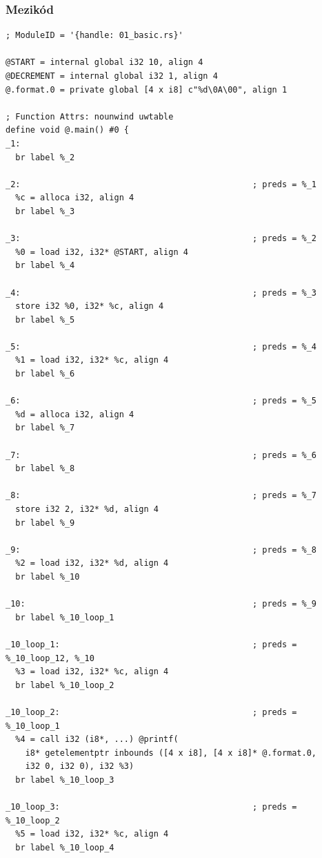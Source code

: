 \documentclass[12pt,a4paper]{article}
\begin{document}
\subsubsection{Mezikód}

\begin{verbatim}
; ModuleID = '{handle: 01_basic.rs}'

@START = internal global i32 10, align 4
@DECREMENT = internal global i32 1, align 4
@.format.0 = private global [4 x i8] c"%d\0A\00", align 1

; Function Attrs: nounwind uwtable
define void @.main() #0 {
_1:
  br label %_2

_2:                                               ; preds = %_1
  %c = alloca i32, align 4
  br label %_3

_3:                                               ; preds = %_2
  %0 = load i32, i32* @START, align 4
  br label %_4

_4:                                               ; preds = %_3
  store i32 %0, i32* %c, align 4
  br label %_5

_5:                                               ; preds = %_4
  %1 = load i32, i32* %c, align 4
  br label %_6

_6:                                               ; preds = %_5
  %d = alloca i32, align 4
  br label %_7

_7:                                               ; preds = %_6
  br label %_8

_8:                                               ; preds = %_7
  store i32 2, i32* %d, align 4
  br label %_9

_9:                                               ; preds = %_8
  %2 = load i32, i32* %d, align 4
  br label %_10

_10:                                              ; preds = %_9
  br label %_10_loop_1

_10_loop_1:                                       ; preds = %_10_loop_12, %_10
  %3 = load i32, i32* %c, align 4
  br label %_10_loop_2

_10_loop_2:                                       ; preds = %_10_loop_1
  %4 = call i32 (i8*, ...) @printf(
    i8* getelementptr inbounds ([4 x i8], [4 x i8]* @.format.0,
    i32 0, i32 0), i32 %3)
  br label %_10_loop_3

_10_loop_3:                                       ; preds = %_10_loop_2
  %5 = load i32, i32* %c, align 4
  br label %_10_loop_4


\end{verbatim}
\end{document}
